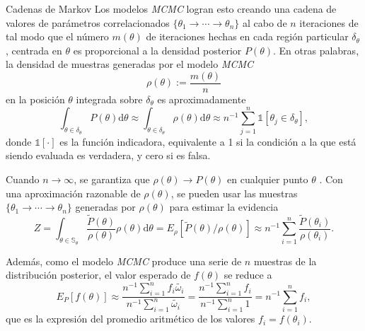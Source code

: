 \documentclass{beamer}
\begin{document}
\begin{frame}[allowframebreaks]{Cadenas de Markov}
	Los modelos \textit{MCMC} logran esto creando una cadena de valores de parámetros correlacionados $\{\theta_1\rightarrow\cdots\rightarrow\theta_n\}$ al cabo de $n$ iteraciones de tal modo que el número $m(\theta)$ de iteraciones hechas en cada región particular $\delta_\theta$, centrada en $\theta$ es proporcional a la densidad posterior $P(\theta)$. En otras palabras, la densidad de muestras generadas por el modelo \textit{MCMC}
	$$\rho(\theta):=\frac{m(\theta)}{n}$$
	en la posición $\theta$ integrada sobre $\delta_\theta$ es aproximadamente
	$$\int_{\theta\in\delta_\theta}P(\theta)\mathrm{d}\theta\approx \int_{\theta\in\delta_\theta}\rho(\theta)\mathrm{d}\theta\approx n^{-1}\sum_{j=1}^n\mathbb{1}[\theta_j\in\delta_\theta],$$
	donde $\mathbb{1}[\cdot]$ es la función indicadora, equivalente a 1 si la condición a la que está siendo evaluada es verdadera, y cero si es falsa.
	
	Cuando $n\rightarrow\infty$, se garantiza que $\rho(\theta)\rightarrow P(\theta)$ en cualquier punto $\theta$ \cite{brooks_gelman_jones_2011}. Con una aproximación razonable de $\rho(\theta)$, se pueden usar las muestras $\{\theta_1\rightarrow\cdots\rightarrow\theta_n\}$ generadas por $\rho(\theta)$ para estimar la evidencia
	$$Z=\int_{\theta\in\mathbb{S}_\theta}\frac{\tilde{P}(\theta)}{\rho(\theta)}\rho(\theta)\mathrm{d}\theta =E_\rho[\tilde{P}(\theta)/\rho(\theta)]\approx n^{-1}\sum_{i=1}^n \frac{\tilde{P}(\theta_i)}{\rho(\theta_i)}.$$
	
	Además, como el modelo \textit{MCMC} produce una serie de $n$ muestras de la distribución posterior, el valor esperado de $f(\theta)$ se reduce a
	$$E_P[f(\theta)]\approx\frac{n^{-1}\sum_{i=1}^n f_i\tilde{\omega_i}}{n^{-1}\sum_{i=1}^n \tilde{\omega_i}}=\frac{n^{-1}\sum_{i=1}^n f_i}{n^{-1}\sum_{i=1}^n 1}=n^{-1}\sum_{i=1}^n f_i,$$
	que es la expresión del promedio aritmético de los valores $f_i=f(\theta_i).$
	\end{frame}
	
\end{document}
